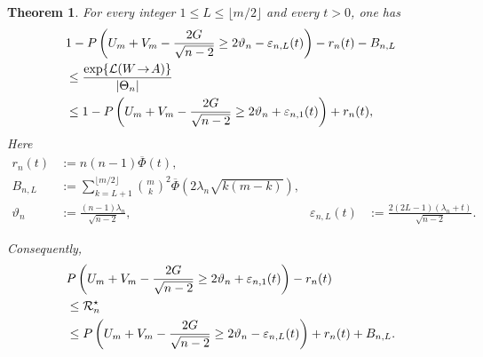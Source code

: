 \documentclass[10pt,a4paper]{amsart}
\newtheorem{theorem}{Theorem}
\newcommand{\ml}[2]{\mathcal{L}(#1\!\to\!#2)}
\begin{document}
\begin{theorem}
\label{thm:gwsbmFiniteLeakage}
For every integer \(1\leq L\leq\lfloor m/2\rfloor\) and every \(t>0\),
one has
\begin{align}
&
1-
P\left(
U_m+V_m-\frac{2G}{\sqrt{n-2}}
\geq
2\vartheta_n-\varepsilon_{n,L}(t)
\right)
-r_n(t)-B_{n,L}
\notag\\
&\leq
\frac{\exp\{\ml{W}{A}\}}{|\Theta_n|}
\notag\\
&\leq
1-
P\left(
U_m+V_m-\frac{2G}{\sqrt{n-2}}
\geq
2\vartheta_n+\varepsilon_{n,1}(t)
\right)
+r_n(t),
\label{eq:gwsbmFiniteLeakageSandwich}
\end{align}
Here
\[
\begin{aligned}
r_n(t)&:=n(n-1)\overline\Phi(t),\\
B_{n,L}&:=
\sum_{k=L+1}^{\lfloor m/2\rfloor}
\binom{m}{k}^{2}
\overline\Phi\!\left(2\lambda_n\sqrt{k(m-k)}\right),\\
\vartheta_n&:=\frac{(n-1)\lambda_n}{\sqrt{n-2}},
&
\varepsilon_{n,L}(t)&:=
\frac{2(2L-1)(\lambda_n+t)}{\sqrt{n-2}}.
\end{aligned}
\]

Consequently,
\begin{align}
&
P\left(
U_m+V_m-\frac{2G}{\sqrt{n-2}}
\geq
2\vartheta_n+\varepsilon_{n,1}(t)
\right)
-r_n(t)
\notag\\
&\leq
\mathcal R_n^\star
\notag\\
&\leq
P\left(
U_m+V_m-\frac{2G}{\sqrt{n-2}}
\geq
2\vartheta_n-\varepsilon_{n,L}(t)
\right)
+r_n(t)+B_{n,L}.
\label{eq:gwsbmFiniteRiskSandwich}
\end{align}
\end{theorem}
\end{document}
